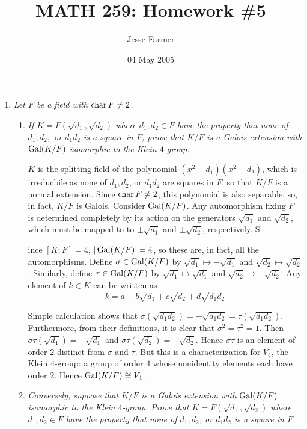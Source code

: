 \documentclass[10pt]{article}
\title{MATH 259: Homework \#5}
\author{Jesse Farmer}
\date{04 May 2005}
\begin{document}
\maketitle
\begin{enumerate}

\item \emph{Let $F$ be a field with $\operatorname{char} F \neq 2$.}
\begin{enumerate}
\item \emph{If $K = F(\sqrt{d_1}, \sqrt{d_2})$ where $d_1, d_2 \in F$ have the property that none of $d_1, d_2,$ or $d_1d_2$ is a square in $F$, prove that $K/F$ is a Galois extension with $\operatorname{Gal}(K/F)$ isomorphic to the Klein $4$-group.}

$K$ is the splitting field of the polynomial $(x^2 - d_1)(x^2 - d_2)$, which is irreducbile as none of $d_1, d_2$, or $d_1d_2$ are squares in $F$, so that $K/F$ is a normal extension.  Since $\operatorname{char} F \neq 2$, this polynomial is also separable, so, in fact, $K/F$ is Galois.  Consider $\operatorname{Gal}(K/F)$.   Any automorphism fixing $F$ is determined completely by its action on the generators $\sqrt{d_1}$ and $\sqrt{d_2}$, which must be mapped to to $\pm \sqrt{d_1}$ and $\pm\sqrt{d_2}$, respectively.  S

ince $[K:F] = 4$, $|\operatorname{Gal}(K/F)| = 4$, so these are, in fact, all the automorphisms.  Define $\sigma \in \operatorname{Gal}(K/F)$ by $\sqrt{d_1} \mapsto - \sqrt{d_1}$ and $\sqrt{d_2} \mapsto \sqrt{d_2}$.  Similarly, define $\tau \in \operatorname{Gal}(K/F)$ by $\sqrt{d_1} \mapsto \sqrt{d_1}$ and $\sqrt{d_2} \mapsto -\sqrt{d_2}$.  Any element of $k \in K$ can be written as
\[
k = a + b\sqrt{d_1} + c\sqrt{d_2} + d\sqrt{d_1d_2}
\]

Simple calculation shows that $\sigma(\sqrt{d_1d_2}) = -\sqrt{d_1d_2} = \tau(\sqrt{d_1d_2})$.  Furthermore, from their definitions, it is clear that $\sigma^2 = \tau^2 = 1$.  Then $\sigma\tau(\sqrt{d_1}) = - \sqrt{d_1}$ and $\sigma\tau(\sqrt{d_2}) = - \sqrt{d_2}$.  Hence $\sigma\tau$ is an element of order $2$ distinct from $\sigma$ and $\tau$.  But this is a characterization for $V_4$, the Klein $4$-group: a group of order $4$ whose nonidentity elements each have order $2$.  Hence $\operatorname{Gal}(K/F) \cong V_4$.

\item \emph{Conversely, suppose that $K/F$ is a Galois extension with $\operatorname{Gal}(K/F)$ isomorphic to the Klein $4$-group.  Prove that $K=F(\sqrt{d_1}, \sqrt{d_2})$ where $d_1, d_2 \in F$ have the property that none of $d_1, d_2$, or $d_1d_2$ is a square in $F$.}


\end{enumerate}
\end{enumerate}
\end{document}
